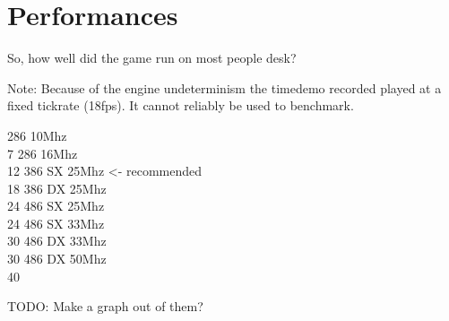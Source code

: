\section{Performances}
So, how well did the game run on most people desk?

Note: Because of the engine undeterminism the timedemo recorded played at a fixed tickrate (18fps). It cannot reliably be used to benchmark.

286 10Mhz\\ 7
286 16Mhz\\ 12
386 SX 25Mhz <- recommended\\ 18
386 DX 25Mhz\\ 24
486 SX 25Mhz\\ 24
486 SX 33Mhz\\ 30
486 DX 33Mhz\\ 30
486 DX 50Mhz\\ 40

TODO: Make a graph out of them?